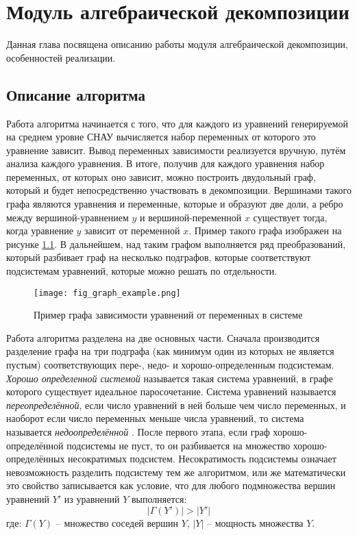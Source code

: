 \chapter{Модуль алгебраической декомпозиции}\label{ch:algdec}

Данная глава посвящена описанию работы модуля алгебраической декомпозиции, особенностей реализации.

\section{Описание алгоритма}
Работа алгоритма начинается с того, что для каждого из уравнений генерируемой на среднем уровне СНАУ вычисляется набор переменных от которого это уравнение зависит. Вывод переменных зависимости реализуется вручную, путём анализа каждого уравнения. В итоге, получив для каждого уравнения набор переменных, от которых оно зависит, можно построить двудольный граф, который и будет непосредственно участвовать в декомпозиции. Вершинами такого графа являются уравнения и переменные, которые и образуют две доли, а ребро между вершиной-уравнением $y$ и вершиной-переменной $x$ существует тогда, когда уравнение $y$ зависит от переменной $x$. Пример такого графа изображен на рисунке \ref{fig:graph_example}. В дальнейшем, над таким графом выполняется ряд преобразований, который разбивает граф на несколько подграфов, которые соответствуют подсистемам уравнений, которые можно решать по отдельности. 

\begin{figure}[h]
	\centering
	\texttt{[image: fig\_graph\_example.png]}
	\caption{Пример графа зависимости уравнений от переменных в системе}
	\label{fig:graph_example}
\end{figure}

Работа алгоритма разделена на две основных части. Сначала производится разделение графа на три подграфа (как минимум один из которых не является пустым) соответствующих пере-, недо- и хорошо-определенным подсистемам. \textit{Хорошо определенной системой} называется такая система уравнений, в графе которого существует идеальное паросочетание. Система уравнений называется \textit{переопределённой}, если число уравнений в ней больше чем число переменных, и наоборот если число переменных меньше числа уравнений, то система называется \textit{недоопределённой} \cite{ait2014reduction}. После первого этапа, если граф хорошо-определённой подсистемы не пуст, то он разбивается на множество хорошо-определённых несократимых подсистем. Несократимость подсистемы означает невозможность разделить подсистему тем же алгоритмом, или же математически это свойство записывается как условие, что для любого подмножества вершин уравнений $Y'$ из уравнений $Y$ выполняется:
\begin{equation*}
 \left|\Gamma(Y') \right| > \left|Y'\right|
\end{equation*}
где: $\Gamma(Y)$ -- множество соседей вершин $Y$, $ \left|Y\right|$ -- мощность множества $Y$.

